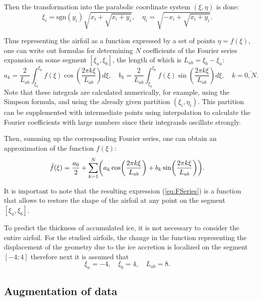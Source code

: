 \documentclass[aerospace,article,submit,moreauthors,pdftex]{Definitions/mdpi}
\begin{document}
Then the transformation into the parabolic coordinate system $ (\xi, \eta) $ is done:
\begin{equation}
    \label{eq:ksi_eta}
    \xi_i = \mathrm{sgn}(y_i) \sqrt{x_i + \sqrt{x_i + y_i}}, \quad \eta_i = \sqrt{-x_i + \sqrt{x_i + y_i}}.
\end{equation}

Thus representing the airfoil as a function expressed by a set of points $ \eta = f (\xi) $, one can write out formulas for determining $ N $ coefficients of the Fourier series expansion on some segment $ [\xi_a, \xi_b] $, the length of which is $ L_{ab} = \xi_b - \xi_a $:
\begin{equation}
    \label{eq:fcoeffs}
    a_k = \frac{2}{L_{ab}} \int_{\xi_a}^{\xi_b} f(\xi) \cos \left( \frac{2 \pi k \xi}{L_{ab}}\right) d \xi, \quad
    b_k = \frac{2}{L_{ab}} \int_{\xi_a}^{\xi_b} f(\xi) \sin \left( \frac{2 \pi k \xi}{L_{ab}}\right) d \xi, \quad k = \overline{0,N}. 
\end{equation}
Note that these integrals are calculated numerically, for example, using the Simpson formula, and using the already given partition $ (\xi_i, \eta_i) $. This partition can be supplemented with intermediate points using interpolation to calculate the Fourier coefficients with large numbers since their integrands oscillate strongly.

Then, summing up the corresponding Fourier series, one can obtain an approximation of the function $ f (\xi) $:
\begin{equation}
    \label{eq:FSeries}
    \Tilde{f} (\xi) = \frac{a_0}{2} + \sum_{k = 1}^N \left( a_k \cos \left( \frac{2 \pi k \xi}{L_{ab}}\right) + b_k \sin \left( \frac{2 \pi k \xi}{L_{ab}}\right) \right).
\end{equation}

It is important to note that the resulting expression (\ref{eq:FSeries}) is a function that allows to restore the shape of the airfoil at any point on the segment $ [\xi_a, \xi_b] $.

To predict the thickness of accumulated ice, it is not necessary to consider the entire airfoil. For the studied airfoils, the change in the function representing the displacement of the geometry due to the ice accretion is localized on the segment $[- 4;4]$ therefore next it is assumed that
$$
\xi_a = -4, \quad \xi_b = 4, \quad L_{ab} = 8. 
$$

\subsection{Augmentation of data}
\end{document}
